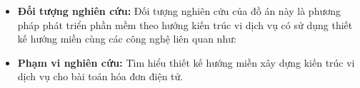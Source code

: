 \begin{itemize}

\item \textbf{Đối tượng nghiên cứu:}   Đối tượng nghiên cứu của  đồ án này  là phương pháp phát triển phần mềm theo hướng kiến trúc vi dịch vụ có sử dụng thiết  kế hướng miền cùng các  công nghệ liên quan như:  

\item \textbf{Phạm vi nghiên cứu:} Tìm hiểu thiết kế hướng miền xây dựng kiến trúc vi dịch vụ cho bài toán hóa đơn điện tử.

\end{itemize}







 
